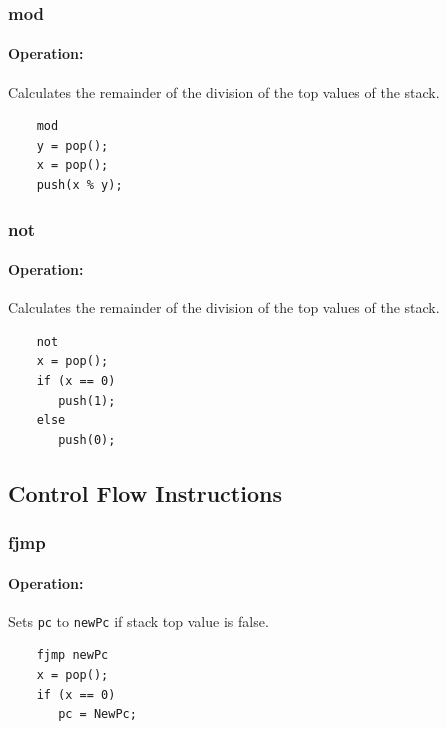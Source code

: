\subsubsection{mod}

\paragraph{Operation:}
Calculates the remainder of the division of the top values of the stack.

	\begin{lstlisting}
	mod
	y = pop();
	x = pop();
	push(x % y);
	\end{lstlisting}

\subsubsection{not}

\paragraph{Operation:}
Calculates the remainder of the division of the top values of the stack.

	\begin{lstlisting}
	not
	x = pop();
	if (x == 0)
	   push(1);
	else
	   push(0);
	\end{lstlisting}

\subsection{Control Flow Instructions}

\subsubsection{fjmp}

\paragraph{Operation:}
Sets \lstinline$pc$ to \lstinline$newPc$ if stack top value is false.

	\begin{lstlisting}
	fjmp newPc
	x = pop();
	if (x == 0)
	   pc = NewPc;
	\end{lstlisting}

